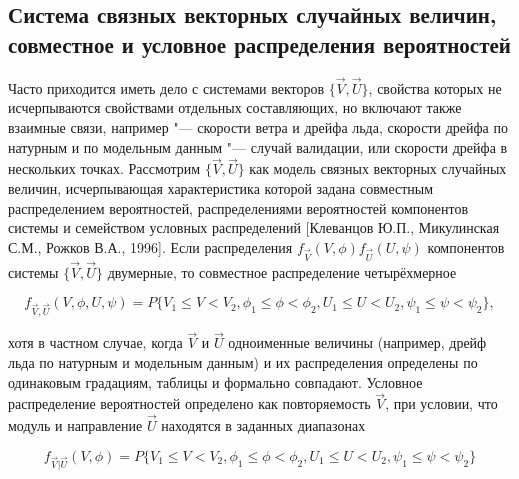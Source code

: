 \subsection{Система связных векторных случайных величин, совместное и условное распределения вероятностей}
Часто приходится иметь дело с системами векторов $\{\vec{V},\vec{U}\}$, свойства которых не исчерпываются свойствами отдельных составляющих, но включают также взаимные связи, например "--- скорости ветра и дрейфа льда, скорости дрейфа по натурным и по модельным данным "--- случай валидации, или скорости дрейфа в нескольких точках. Рассмотрим $\{\vec{V},\vec{U}\}$ как модель связных векторных случайных величин, исчерпывающая характеристика которой задана совместным распределением вероятностей, распределениями вероятностей компонентов системы и семейством условных распределений [Клеванцов Ю.П., Микулинская С.М., Рожков В.А., 1996]. Если распределения $f_{\vec{V}}(V,\phi) f_{\vec{U}}(U,\psi)$  компонентов системы $\{\vec{V},\vec{U}\}$ двумерные, то совместное распределение четырёхмерное 
		
\begin{equation}
\label{eq:equation3_18}
{f_{\vec{V},\vec{U}}}(V,\phi,U,\psi)=P\{V_{1}\le{V}<{V_2}, \phi_1\le\phi<{\phi_2}, {U_1}\le{U}<{U_2}, \psi_1\le{\psi}<{\psi_2}\},
\end{equation} 

хотя в частном случае, когда $\vec{V}$ и $\vec{U}$ одноименные величины (например, дрейф льда по натурным и модельным данным) и их распределения определены по одинаковым градациям, таблицы  и  формально совпадают.
Условное распределение вероятностей определено как повторяемость $\vec{V}$, при условии, что модуль и направление $\vec{U}$ находятся в заданных диапазонах

\begin{equation}
\label{eq:equation3_19}
{f_{\vec{V}|\vec{U}}}(V,\phi)=P\{V_{1}\le{V}<{V_2}, \phi_1\le\phi<{\phi_2}, {U_1}\le{U}<{U_2}, \psi_1\le{\psi}<{\psi_2}\}
\end{equation}

